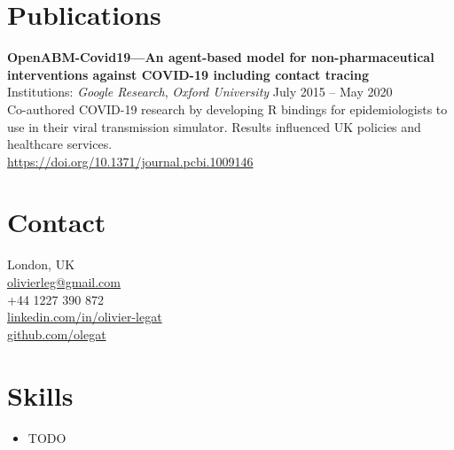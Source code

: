\documentclass[a4paper,10pt]{article}
\begin{document}
{\begin{minipage}[t]{0.65\textwidth}
    \section*{\color{navy} Publications}
    \textbf{OpenABM-Covid19—An agent-based model for non-pharmaceutical interventions against COVID-19 including contact tracing}\\
    Institutions: \textit{Google Research}, \textit{Oxford University} \hfill July 2015 -- May 2020\\[1.0em]
    Co-authored COVID-19 research by developing R bindings for epidemiologists to use in their viral transmission simulator. Results influenced UK policies and healthcare services.\\
    \href{https://doi.org/10.1371/journal.pcbi.1009146}{https://doi.org/10.1371/journal.pcbi.1009146}
\end{minipage}%
\hfill%
\begin{minipage}[t]{0.32\textwidth}
    \colorbox{darkbg}{%
    \begin{minipage}[t][\textheight]{\dimexpr\textwidth-10pt}
        \raggedright
        \vspace{0.5cm} %

        \color{white} %
        \section*{\color{lightblue} Contact}
         London, UK \\
         \href{mailto:olivierleg@gmail.com}{olivierleg@gmail.com} \\
         +44 1227 390 872 \\
         \href{https://www.linkedin.com/in/olivier-legat}{linkedin.com/in/olivier-legat} \\
         \href{https://github.com/olegat}{github.com/olegat} \\

        \section*{\color{lightblue} Skills}
        \begin{itemize}[leftmargin=1em, nosep]
            \item TODO
        \end{itemize}


\end{minipage}}
\end{minipage}}
\end{document}
